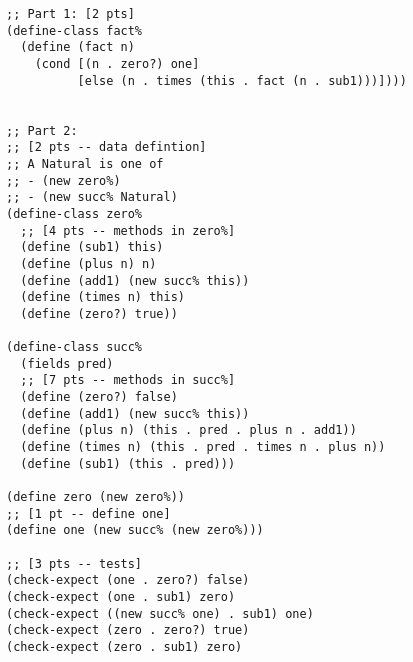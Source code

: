 \documentclass[12pt]{article}                   %
\newenvironment{solution}{}{}
\begin{document}
\begin{solution}
\begin{verbatim}
;; Part 1: [2 pts]
(define-class fact%
  (define (fact n)
    (cond [(n . zero?) one]
          [else (n . times (this . fact (n . sub1)))])))


;; Part 2:
;; [2 pts -- data defintion]
;; A Natural is one of
;; - (new zero%)
;; - (new succ% Natural)
(define-class zero%
  ;; [4 pts -- methods in zero%]
  (define (sub1) this)
  (define (plus n) n)
  (define (add1) (new succ% this))
  (define (times n) this)
  (define (zero?) true))

(define-class succ%
  (fields pred)
  ;; [7 pts -- methods in succ%]
  (define (zero?) false)
  (define (add1) (new succ% this))
  (define (plus n) (this . pred . plus n . add1))
  (define (times n) (this . pred . times n . plus n))
  (define (sub1) (this . pred)))

(define zero (new zero%))
;; [1 pt -- define one]
(define one (new succ% (new zero%)))

;; [3 pts -- tests]
(check-expect (one . zero?) false)
(check-expect (one . sub1) zero)
(check-expect ((new succ% one) . sub1) one)
(check-expect (zero . zero?) true)
(check-expect (zero . sub1) zero)
\end{verbatim}
\newpage
\end{solution}
\end{document}
